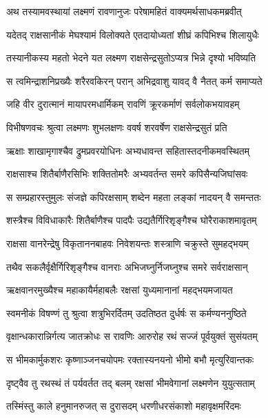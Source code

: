 
\twolineshloka
{अथ तस्यामवस्थायां लक्ष्मणं रावणानुजः}
{परेषामहितं वाक्यमर्थसाधकमब्रवीत्} %

\twolineshloka
{यदेतद् राक्षसानीकं मेघश्यामं विलोक्यते}
{एतदायोध्यतां शीघ्रं कपिभिश्च शिलायुधैः} %

\twolineshloka
{तस्यानीकस्य महतो भेदने यत लक्ष्मण}
{राक्षसेन्द्रसुतोऽप्यत्र भिन्ने दृश्यो भविष्यति} %

\twolineshloka
{स त्वमिन्द्राशनिप्रख्यैः शरैरवकिरन् परान्}
{अभिद्रवाशु यावद् वै नैतत् कर्म समाप्यते} %

\twolineshloka
{जहि वीर दुरात्मानं मायापरमधार्मिकम्}
{रावणिं क्रूरकर्माणं सर्वलोकभयावहम्} %

\twolineshloka
{विभीषणवचः श्रुत्वा लक्ष्मणः शुभलक्षणः}
{ववर्ष शरवर्षेण राक्षसेन्द्रसुतं प्रति} %

\twolineshloka
{ऋक्षाः शाखामृगाश्चैव द्रुमप्रवरयोधिनः}
{अभ्यधावन्त सहितास्तदनीकमवस्थितम्} %

\twolineshloka
{राक्षसाश्च शितैर्बाणैरसिभिः शक्तितोमरैः}
{अभ्यवर्तन्त समरे कपिसैन्यजिघांसवः} %

\twolineshloka
{स सम्प्रहारस्तुमुलः संजज्ञे कपिरक्षसाम्}
{शब्देन महता लङ्कां नादयन् वै समन्ततः} %

\twolineshloka
{शस्त्रैश्च विविधाकारैः शितैर्बाणैश्च पादपैः}
{उद्यतैर्गिरिशृङ्गैश्च घोरैराकाशमावृतम्} %

\twolineshloka
{राक्षसा वानरेन्द्रेषु विकृताननबाहवः}
{निवेशयन्तः शस्त्राणि चक्रुस्ते सुमहद्भयम्} %

\twolineshloka
{तथैव सकलैर्वृक्षैर्गिरिशृङ्गैश्च वानराः}
{अभिजघ्नुर्निजघ्नुश्च समरे सर्वराक्षसान्} %

\twolineshloka
{ऋक्षवानरमुख्यैश्च महाकायैर्महाबलैः}
{रक्षसां युध्यमानानां महद्भयमजायत} %

\twolineshloka
{स्वमनीकं विषण्णं तु श्रुत्वा शत्रुभिरर्दितम्}
{उदतिष्ठत दुर्धर्षः स कर्मण्यननुष्ठिते} %

\twolineshloka
{वृक्षान्धकारान्निर्गत्य जातक्रोधः स रावणिः}
{आरुरोह रथं सज्जं पूर्वयुक्तं सुसंयतम्} %

\twolineshloka
{स भीमकार्मुकशरः कृष्णाञ्जनचयोपमः}
{रक्तास्यनयनो भीमो बभौ मृत्युरिवान्तकः} %

\twolineshloka
{दृष्ट्वैव तु रथस्थं तं पर्यवर्तत तद् बलम्}
{रक्षसां भीमवेगानां लक्ष्मणेन युयुत्सताम्} %

\twolineshloka
{तस्मिंस्तु काले हनुमानरुजत् स दुरासदम्}
{धरणीधरसंकाशो महावृक्षमरिंदमः} %

